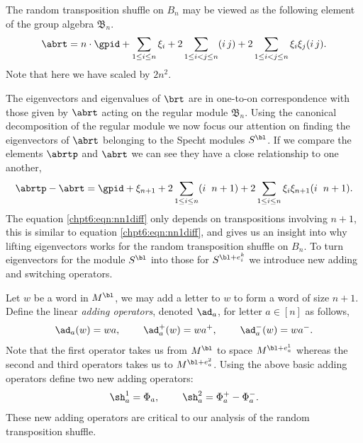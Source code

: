 \documentclass[11pt]{report}
\begin{document}
\begin{defn}
	The random transposition shuffle on $B_{n}$ may be viewed as the following element of the group algebra $\mathfrak{B}_{n}$.
	\begin{eqnarray}
	\abrt = n \cdot \gpid + \sum_{1\leq i \leq n} \xi_{i} + 2 
	\sum_{1\leq i < j \leq n} (i \, j)  + 2\sum_{1\leq i <j\leq n} \xi_{i}\xi_{j}(i \, j ).
	\end{eqnarray}
	Note that here we have scaled by $2n^{2}$.
\end{defn}

The eigenvectors and eigenvalues of $\brt$ are in one-to-on correspondence with those given by $\abrt$ acting on the regular module $\mathfrak{B}_{n}$. Using the canonical decomposition of the regular module we now focus our attention on finding the eigenvectors of $\abrt$ belonging to the Specht modules $S^{\bl}$. If we compare the elements $\abrtp$ and $\abrt$ we can see they have a close relationship to one another,
\begin{eqnarray}
\abrtp - \abrt = \gpid + \xi_{n+1} + 2\sum_{1\leq i \leq n} (i \hspace{0.2cm} n+1) + 2\sum_{1\leq i \leq n} \xi_{i}\xi_{n+1}(i \hspace{0.2cm} n+1) .\label{chpt6:eqn:nn1diff}
\end{eqnarray}
The equation \eqref{chpt6:eqn:nn1diff} only depends on transpositions involving $n+1$, this is similar to equation \eqref{chpt6:eqn:nn1diff}, and gives us an insight into why lifting eigenvectors works for the random transposition shuffle on $B_{n}$. To turn eigenvectors for the module $S^{\bl}$ into those for $S^{\bl + e_{i}^{k}}$ we introduce new adding and switching operators.

\begin{defn}
	Let $w$ be a word in $M^{\bl}$, we may add a letter to 
	$w$ to form a word of size $n+1$.	Define the linear \emph{adding 
		operators}, denoted $\ad_{a}$, for letter $a\in [n]$ as follows,
	\[\ad_{a}(w) = w  a, \hspace{0.8cm} \ad_{a}^{+}( w ) = w
	a^{+}, \hspace{0.8cm} \ad_{a}^{-}( w ) = w
	a^{-}.\]
	Note that the first operator takes us from $M^{\bl}$ to 
	space $M^{\bl +e_{a}^{1} }$ whereas the second and third operators takes us to $M^{\bl 
		+e_{a}^{2} }$. Using the above basic adding operators define two new adding operators:
	\[\sh_{a}^{1} = \Phi_{a},  \hspace{0.8cm} \sh_{a}^{2} = \Phi_{a}^{+} - 
	\Phi_{a}^{-}.\]
	These new adding operators are critical to our analysis of the random transposition shuffle.
\end{defn}
\end{document}
